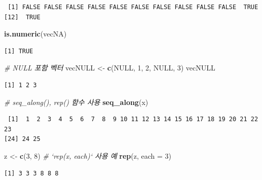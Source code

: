 \documentclass[11pt,a4paper]{book}
\newenvironment{Shaded}{\begin{snugshade}}{\end{snugshade}}
\newcommand{\KeywordTok}[1]{\textcolor[rgb]{0.13,0.29,0.53}{\textbf{#1}}}
\newcommand{\DataTypeTok}[1]{\textcolor[rgb]{0.13,0.29,0.53}{#1}}
\newcommand{\DecValTok}[1]{\textcolor[rgb]{0.00,0.00,0.81}{#1}}
\newcommand{\StringTok}[1]{\textcolor[rgb]{0.31,0.60,0.02}{#1}}
\newcommand{\CommentTok}[1]{\textcolor[rgb]{0.56,0.35,0.01}{\textit{#1}}}
\newcommand{\OtherTok}[1]{\textcolor[rgb]{0.56,0.35,0.01}{#1}}
\newcommand{\NormalTok}[1]{#1}
\theoremstyle{definition}
\theoremstyle{definition}
\theoremstyle{definition}
\theoremstyle{remark}
\begin{document}
\begin{verbatim}
 [1] FALSE FALSE FALSE FALSE FALSE FALSE FALSE FALSE FALSE FALSE  TRUE
[12]  TRUE
\end{verbatim}

\begin{Shaded}
\begin{Highlighting}[]
\KeywordTok{is.numeric}\NormalTok{(vecNA)}
\end{Highlighting}
\end{Shaded}

\begin{verbatim}
[1] TRUE
\end{verbatim}

\begin{Shaded}
\begin{Highlighting}[]
\CommentTok{# NULL 포함 벡터}
\NormalTok{vecNULL <-}\StringTok{ }\KeywordTok{c}\NormalTok{(}\OtherTok{NULL}\NormalTok{, }\DecValTok{1}\NormalTok{, }\DecValTok{2}\NormalTok{, }\OtherTok{NULL}\NormalTok{, }\DecValTok{3}\NormalTok{)}
\NormalTok{vecNULL}
\end{Highlighting}
\end{Shaded}

\begin{verbatim}
[1] 1 2 3
\end{verbatim}

\begin{Shaded}
\begin{Highlighting}[]
\CommentTok{# seq_along(), rep() 함수 사용}
\KeywordTok{seq_along}\NormalTok{(x)}
\end{Highlighting}
\end{Shaded}

\begin{verbatim}
 [1]  1  2  3  4  5  6  7  8  9 10 11 12 13 14 15 16 17 18 19 20 21 22 23
[24] 24 25
\end{verbatim}

\begin{Shaded}
\begin{Highlighting}[]
\NormalTok{z <-}\StringTok{ }\KeywordTok{c}\NormalTok{(}\DecValTok{3}\NormalTok{, }\DecValTok{8}\NormalTok{)}
\CommentTok{# `rep(x, each)` 사용 예}
\KeywordTok{rep}\NormalTok{(z, }\DataTypeTok{each =} \DecValTok{3}\NormalTok{)}
\end{Highlighting}
\end{Shaded}

\begin{verbatim}
[1] 3 3 3 8 8 8
\end{verbatim}
\end{document}
